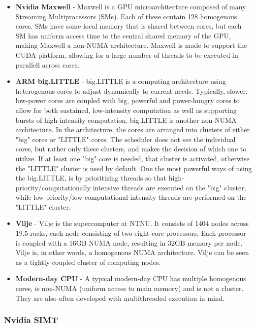 \documentclass[paper=a4, fontsize=11pt]{scrartcl} %
\numberwithin{equation}{section} %
\numberwithin{figure}{section} %
\numberwithin{table}{section} %
\begin{document}
\begin{itemize}
    \item \textbf{Nvidia Maxwell} - Maxwell is a GPU microarchitecture composed of many Streaming Multiprocessors (SMs).
        Each of these contain 128 homogenous cores.
        SMs have some local memory that is shared between cores, but each SM has uniform access time to the central shared memory of the GPU, making Maxwell a non-NUMA architecture.
        Maxwell is made to support the CUDA platform, allowing for a large number of threads to be executed in parallell across cores.
    \item \textbf{ARM big.LITTLE} - big.LITTLE is a computing architecture using heterogenous cores to adjust dynamically to current needs.
        Typically, slower, low-power cores are coupled with big, powerful and power-hungry cores to allow for both sustained, low-intensity computation as well as supporting bursts of high-intensity computation.
        big.LITTLE is another non-NUMA architecture.
        In the architecture, the cores are arranged into clusters of either "big" cores or "LITTLE" cores.
        The scheduler does not see the individual cores, but rather only these clusters, and makes the decision of which one to utilize.
        If at least one "big" core is needed, that cluster is activated, otherwise the "LITTLE" cluster is used by default.
        One the most powerful ways of using the big.LITTLE, is by prioritizing threads so that high-priority/computationally intensive threads are executed on the "big" cluster, while low-priority/low computational intensity threads are performed on the "LITTLE" cluster.
    \item \textbf{Vilje} - Vilje is the supercomputer at NTNU.
        It consists of 1404 nodes across 19.5 racks, each node consisting of two eight-core processors.
        Each processor is coupled with a 16GB NUMA node, resulting in 32GB memory per node.
        Vilje is, in other words, a homogenous NUMA architecture.
        Vilje can be seen as a tightly coupled cluster of computing nodes.
        
    \item \textbf{Modern-day CPU} - A typical modern-day CPU has multiple homogenous cores, is non-NUMA (uniform access to main memory) and is not a cluster.
        They are also often developed with multithreaded execution in mind.
        
\end{itemize}

\subsubsection{Nvidia SIMT}
\end{document}
